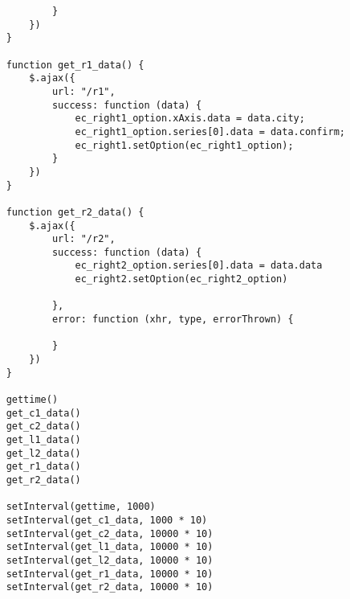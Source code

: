 \begin{lstlisting}
            }
        })
    }
    
    function get_r1_data() {
        $.ajax({
            url: "/r1",
            success: function (data) {
                ec_right1_option.xAxis.data = data.city;
                ec_right1_option.series[0].data = data.confirm;
                ec_right1.setOption(ec_right1_option);
            }
        })
    }
    
    function get_r2_data() {
        $.ajax({
            url: "/r2",
            success: function (data) {
                ec_right2_option.series[0].data = data.data
                ec_right2.setOption(ec_right2_option)
    
            },
            error: function (xhr, type, errorThrown) {
    
            }
        })
    }
    
    gettime()
    get_c1_data()
    get_c2_data()
    get_l1_data()
    get_l2_data()
    get_r1_data()
    get_r2_data()
    
    setInterval(gettime, 1000)
    setInterval(get_c1_data, 1000 * 10)
    setInterval(get_c2_data, 10000 * 10)
    setInterval(get_l1_data, 10000 * 10)
    setInterval(get_l2_data, 10000 * 10)
    setInterval(get_r1_data, 10000 * 10)
    setInterval(get_r2_data, 10000 * 10)
\end{lstlisting}

